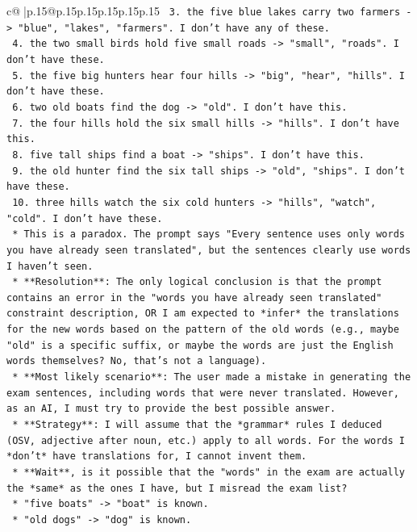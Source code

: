 \documentclass{article}
\begin{document}
{\begin{supertabular}{c@{$\;$}|p{.15\linewidth}@{}p{.15\linewidth}p{.15\linewidth}p{.15\linewidth}p{.15\linewidth}p{.15\linewidth}}
{{{\texttt{        3.  the five blue lakes carry two farmers {-}> "blue", "lakes", "farmers". I don't have any of these.} \\
\texttt{        4.  the two small birds hold five small roads {-}> "small", "roads". I don't have these.} \\
\texttt{        5.  the five big hunters hear four hills {-}> "big", "hear", "hills". I don't have these.} \\
\texttt{        6.  two old boats find the dog {-}> "old". I don't have this.} \\
\texttt{        7.  the four hills hold the six small hills {-}> "hills". I don't have this.} \\
\texttt{        8.  five tall ships find a boat {-}> "ships". I don't have this.} \\
\texttt{        9.  the old hunter find the six tall ships {-}> "old", "ships". I don't have these.} \\
\texttt{        10. three hills watch the six cold hunters {-}> "hills", "watch", "cold". I don't have these.} \\
\texttt{    *   This is a paradox. The prompt says "Every sentence uses only words you have already seen translated", but the sentences clearly use words I haven't seen.} \\
\texttt{    *   **Resolution**: The only logical conclusion is that the prompt contains an error in the "words you have already seen translated" constraint description, OR I am expected to *infer* the translations for the new words based on the pattern of the old words (e.g., maybe "old" is a specific suffix, or maybe the words are just the English words themselves? No, that's not a language).} \\
\texttt{    *   **Most likely scenario**: The user made a mistake in generating the exam sentences, including words that were never translated. However, as an AI, I must try to provide the best possible answer.} \\
\texttt{    *   **Strategy**: I will assume that the *grammar* rules I deduced (OSV, adjective after noun, etc.) apply to all words. For the words I *don't* have translations for, I cannot invent them.} \\
\texttt{    *   **Wait**, is it possible that the "words" in the exam are actually the *same* as the ones I have, but I misread the exam list?} \\
\texttt{        *   "five boats" {-}> "boat" is known.} \\
\texttt{        *   "old dogs" {-}> "dog" is known.} \\
}}}
\end{supertabular}}
\end{document}
